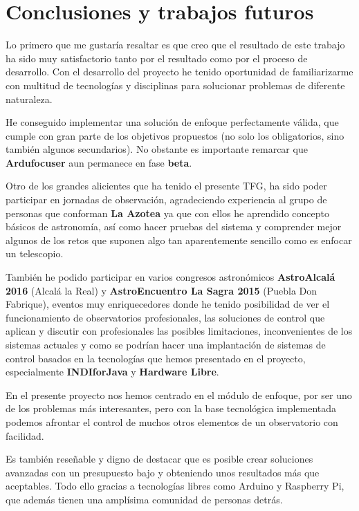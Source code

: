 \chapter{Conclusiones y trabajos futuros}

Lo primero que me gustaría resaltar es que creo que el resultado de este trabajo ha sido muy satisfactorio tanto por el resultado como por el proceso de desarrollo. Con el desarrollo del proyecto he tenido oportunidad de familiarizarme con multitud de tecnologías y disciplinas para solucionar problemas de diferente naturaleza. 

He conseguido implementar una solución de enfoque perfectamente válida, que cumple con gran parte de los objetivos propuestos (no solo los obligatorios, sino también algunos secundarios). No obstante es importante remarcar que \textbf{Ardufocuser} aun permanece en fase \textbf{beta}.

Otro de los grandes alicientes que ha tenido el presente TFG, ha sido poder participar en jornadas de observación, agradeciendo experiencia al grupo de personas que conforman \textbf{La Azotea} \cite{laazotea} ya que con ellos he aprendido concepto básicos de astronomía, así como hacer pruebas del sistema y comprender mejor algunos de los retos que suponen algo tan aparentemente sencillo como es enfocar un telescopio.

También he podido participar en varios congresos astronómicos \textbf{AstroAlcalá 2016} (Alcalá la Real) y \textbf{AstroEncuentro La Sagra 2015} (Puebla Don Fabrique), eventos muy enriquecedores donde he tenido posibilidad de ver el funcionamiento de observatorios profesionales, las soluciones de control que aplican y discutir con profesionales las posibles limitaciones, inconvenientes de los sistemas actuales y como se podrían hacer una implantación de sistemas de control basados en la tecnologías que hemos presentado en el proyecto, especialmente \textbf{INDIforJava} y \textbf{Hardware Libre}.

En el presente proyecto nos hemos centrado en el módulo de enfoque, por ser uno de los problemas más interesantes, pero con la base tecnológica implementada podemos afrontar el control de muchos otros elementos de un observatorio con facilidad. 

Es también reseñable y digno de destacar que es posible crear soluciones avanzadas con un presupuesto bajo y obteniendo unos resultados más que aceptables. Todo ello gracias a tecnologías libres como Arduino y Raspberry Pi, que además tienen una amplísima comunidad de personas detrás. 

